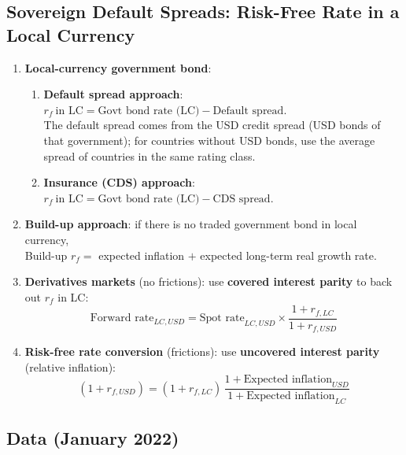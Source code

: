 \subsection{Sovereign Default Spreads: Risk-Free Rate in a Local Currency}
\begin{enumerate}
  \item \textbf{Local-currency government bond}:
  \begin{enumerate}[label=(\alph*)]
    \item \textbf{Default spread approach}: \quad $r_f\ \text{in LC}=\text{Govt bond rate (LC)}-\text{Default spread}$.\\ The default spread comes from the USD credit spread (USD bonds of that government); for countries without USD bonds, use the average spread of countries in the same rating class.
    \item \textbf{Insurance (CDS) approach}: \quad $r_f\ \text{in LC}=\text{Govt bond rate (LC)}-\text{CDS spread}$.
  \end{enumerate}
  \item \textbf{Build-up approach}: if there is no traded government bond in local currency,\\ \quad Build-up $r_f=$ expected inflation $+$ expected long-term real growth rate.
  \item \textbf{Derivatives markets} (no frictions): use \textbf{covered interest parity} to back out $r_f$ in LC:
  \[
  \text{Forward rate}_{LC,USD}=\text{Spot rate}_{LC,USD}\times\frac{1+r_{f,LC}}{1+r_{f,USD}}
  \]
  \item \textbf{Risk-free rate conversion} (frictions): use \textbf{uncovered interest parity} (relative inflation):
  \[
  (1+r_{f,USD})=(1+r_{f,LC})\,\frac{1+\text{Expected inflation}_{USD}}{1+\text{Expected inflation}_{LC}}
  \]
\end{enumerate}

\subsection{Data (January 2022)}

